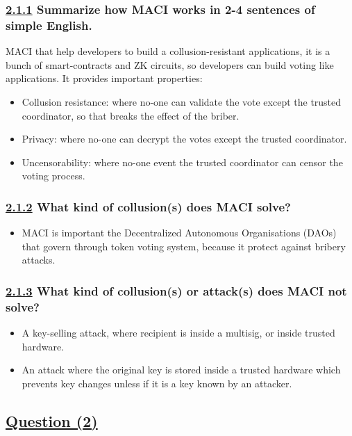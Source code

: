 \documentclass[letterpaper, 10 pt, conference]{ieeeconf}  %
\begin{document}
\subsubsection{\textbf{\underline{2.1.1} Summarize how MACI works in 2-4 sentences of simple English.}}

MACI that help developers to build a collusion-resistant applications, it is a bunch of smart-contracts and ZK circuits, so developers can build voting like applications. It provides important properties: 

\begin{itemize}
    \item Collusion resistance: where no-one can validate the vote except the trusted coordinator, so that breaks the effect of the briber. 
    \item Privacy: where no-one can decrypt the votes except the trusted coordinator.
    \item Uncensorability: where no-one event the trusted coordinator can censor the voting process. \cite{c1}
\end{itemize}

\subsubsection{\textbf{\underline{2.1.2} What kind of collusion(s) does MACI solve?}}
\begin{itemize}
    \item MACI is important the Decentralized Autonomous Organisations (DAOs) that govern through token voting system, because it protect against bribery attacks. 
\end{itemize}

\subsubsection{\textbf{\underline{2.1.3} What kind of collusion(s) or attack(s) does MACI not solve?}}
\begin{itemize}
    \item A key-selling attack, where recipient is inside a multisig, or inside trusted hardware.
    \item An attack where the original key is stored inside a trusted hardware which prevents key changes unless if it is a key known by an attacker. 
\end{itemize}
\subsection{\textbf{\underline{Question (2)}}}
\end{document}
